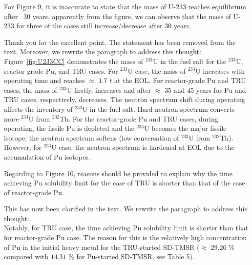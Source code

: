 \documentclass[answers,11pt]{exam}
\begin{document}
\begin{questions}
\begin{solution}
        \end{solution}

        \question For Figure 9, it is inaccurate to state that the mass of U-233 reaches equilibrium after ~30 years, apparently from the figure, we can observe that the mass of U-233 for three of the cases still increase/decrease after 30 years.
        
        \begin{solution}
                Thank you for the excellent point. The statement has been removed from the text.
                Moreover, we rewrite the paragraph to address this thought:\\
                Figure~\ref{fig:U233CC} demonstrates the mass of $^{233}$U in the fuel salt for the $^{233}$U, reactor-grade Pu, and TRU cases. For $^{233}$U case, the mass of $^{233}$U increases with operating time and reaches $\approx$ $1.7$ $t$ at the EOL. For reactor-grade Pu and TRU cases, the mass of $^{233}$U firstly, increases and after $\approx$ $35$ and $45$ years for Pu and TRU cases, respectively, decreases. The neutron spectrum shift during operating affects the inventory of $^{233}$U in the fuel salt. Hard neutron spectrum converts more $^{233}$U from $^{232}$Th. For the reactor-grade Pu and TRU cases, during operating, the fissile Pu is depleted and the $^{233}$U becomes the major fissile isotope; the neutron spectrum softens (low conversation of $^{233}$U from $^{232}$Th). However, for $^{233}$U case, the neutron spectrum is hardened at EOL due to the accumulation of Pu isotopes.                
                
        \end{solution}

        \question Regarding to Figure 10, reasons should be provided to explain why the time achieving Pu solubility limit for the case of TRU is shorter than that of the case of reactor-grade Pu.
        \begin{solution}
                 This has now been clarified in the text.
                 We rewrite the paragraph to address this thought:\\
                 Notably, for TRU case, the time achieving Pu solubility limit is shorter than that for reactor-grade Pu case. The reason for this is the relatively high concentration of Pu in the initial heavy metal for the TRU-started SD-TMSR ($\approx$ $29.26$ \% compared with $14.31$ \% for Pu-started SD-TMSR, see Table 5).
                 

\end{solution}
\end{questions}
\end{document}

